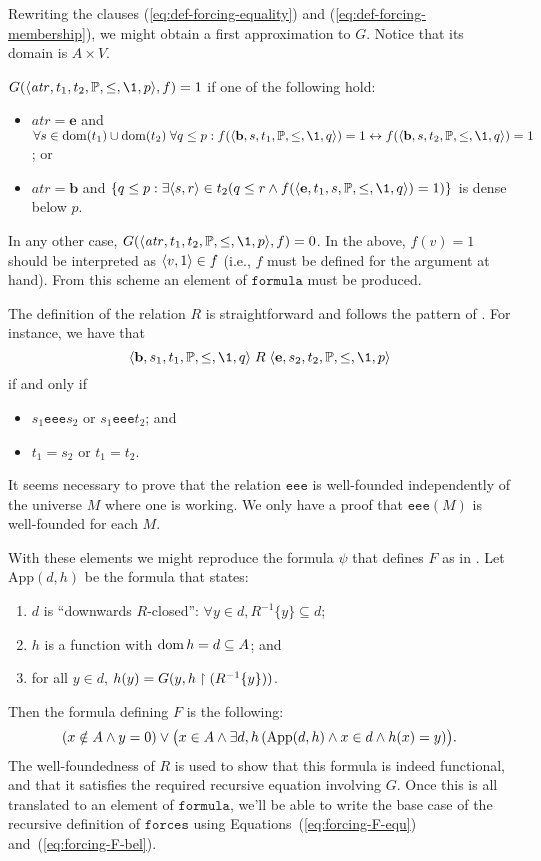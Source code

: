 \documentclass[11pt,english]{article}
\renewcommand{\PP}{\mathbb{P}}
\renewcommand{\app}{\mathrm{App}}
\newcommand{\formula}{\ensuremath{\mathtt{formula}}}
\newcommand{\forceisa}{\mathtt{forces}}
\newcommand{\equ}{\mathbf{e}}
\newcommand{\bel}{\mathbf{b}}
\newcommand{\atr}{\mathit{atr}}
\newcommand{\reee}{\mathrel{\mathtt{eee}}}
\begin{document}
Rewriting the clauses (\ref{eq:def-forcing-equality}) and
(\ref{eq:def-forcing-membership}), we might obtain a first
approximation to $G$. Notice that its domain is $A\times V$.

$G(\lb\atr,t_1,t_2,\PP,\leq,\1,p\rb,f) =1$ if one of the following hold:
\begin{itemize}
\item $\atr=\equ$ and   $\forall s\in\dom(t_1)\cup\dom(t_2)\;\forall q\leq p :
  f(\lb\bel,s,t_1,\PP,\leq,\1,q\rb) =1  \lsii
  f(\lb\bel,s,t_2,\PP,\leq,\1,q\rb) =1$; or
\item $\atr=\bel$ and $\{q\leq p : \exists \lb s,r\rb\in t_2 (q\leq r \y
  f(\lb\equ,t_1,s,\PP,\leq,\1,q\rb) =1)\}$ is dense below $p$.
\end{itemize}
In any other case, $G(\lb\atr,t_1,t_2,\PP,\leq,\1,p\rb,f) =0$. In the
above, $f(v)=1$ should be interpreted as $\langle v,1\rangle\in f$ (i.e., $f$
must be defined for the argument at hand). From this scheme an element
of $\formula$ must be produced.

The definition of the relation $R$ is straightforward and follows the
pattern of \cite[p.~257]{kunen2011set}. For instance, we have that 
\[
\lb\bel,s_1,t_1,\PP,\leq,\1,q\rb\mathrel{R}
\lb\equ,s_2,t_2,\PP,\leq,\1,p\rb
\]
if and only if 
\begin{itemize}
\item $s_1 \reee  s_2$ or $s_1\reee t_2$; and
\item $t_1 = s_2$ or $t_1 = t_2$.
\end{itemize}
%
\begin{framed}
  It seems necessary to prove that the relation $\reee$ is
  well-founded independently of the universe $M$ where one is
  working. We only
  have a proof that ${\reee}(M)$ is well-founded for each $M$.
\end{framed}

With these elements we might reproduce the formula $\psi$ that defines
$F$ as in \cite[p.~49]{kunen2011set}. Let  $\app(d,h)$  be the formula
that states:
\begin{enumerate}
\item \label{item:dom-R-cerrado} $d$ is ``downwards $R$-closed'':
  $\forall y \in d, 
  R^{-1}\{y\}\subseteq d$;
\item \label{item:4} $h$ is a function with $\operatorname{dom} h =d \subseteq A$; and
\item \label{item:3} for all $y\in d$, $h(y) = G(y,h\upharpoonright(R^{-1}\{y\}))$.
\end{enumerate}
Then the formula defining $F$ is the following:
\[
(x\notin A \y y=0) \o \bigl(x\in A \y \exists d,h\, (\app(d,h)\y
x\in d \y h(x)=y)\bigr).
\]
The well-foundedness of $R$ is used to show that this formula is indeed
functional, and that it satisfies the required recursive equation
involving $G$. Once this is all translated to an element of \formula,
we'll be able to write the base case of the recursive definition of
$\forceisa$ using Equations~(\ref{eq:forcing-F-equ})
and~(\ref{eq:forcing-F-bel}).
 
\end{document}
